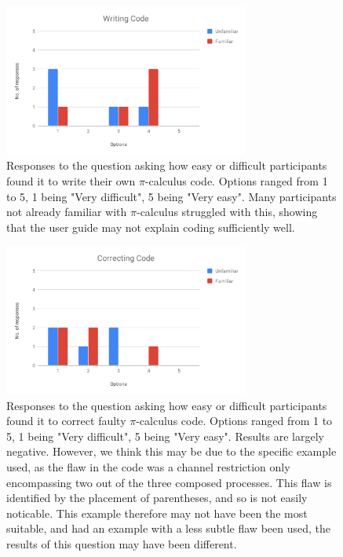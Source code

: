 \documentclass{l4proj}
\begin{document}
\begin{figure}[H]
\centering
\includegraphics[width=0.72\textwidth]{images/WriteCode.pdf}
\caption{Responses to the question asking how easy or difficult participants found it to write their own $\pi$-calculus code. Options ranged from 1 to 5, 1 being "Very difficult", 5 being "Very easy". Many participants not already familiar with $\pi$-calculus struggled with this, showing that the user guide may not explain coding sufficiently well.}
\label{fig:WriteCode}
\end{figure}

\begin{figure}[H]
\centering
\includegraphics[width=0.72\textwidth]{images/CorrectCode.pdf}
\caption{Responses to the question asking how easy or difficult participants found it to correct faulty $\pi$-calculus code. Options ranged from 1 to 5, 1 being "Very difficult", 5 being "Very easy". Results are largely negative. However, we think this may be due to the specific example used, as the flaw in the code was a channel restriction only encompassing two out of the three composed processes. This flaw is identified by the placement of parentheses, and so is not easily noticable. This example therefore may not have been the most suitable, and had an example with a less subtle flaw been used, the results of this question may have been different.}
\label{fig:CorrectCode}
\end{figure}
\end{document}
